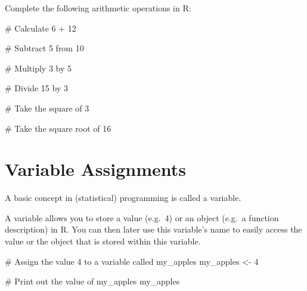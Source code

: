\documentclass[
  12pt,
  letterpaper,
]{scrbook}
\newenvironment{Shaded}{\begin{snugshade}}{\end{snugshade}}
\newcommand{\CommentTok}[1]{\textcolor[rgb]{0.37,0.37,0.37}{#1}}
\newcommand{\DecValTok}[1]{\textcolor[rgb]{0.68,0.00,0.00}{#1}}
\newcommand{\NormalTok}[1]{\textcolor[rgb]{0.00,0.23,0.31}{#1}}
\newcommand{\OtherTok}[1]{\textcolor[rgb]{0.00,0.23,0.31}{#1}}
\theoremstyle{plain}
\theoremstyle{definition}
\theoremstyle{remark}
\begin{document}
Complete the following arithmetic operations in R:

\begin{Shaded}
\begin{Highlighting}[]
\CommentTok{\# Calculate 6 + 12}
\end{Highlighting}
\end{Shaded}

\begin{Shaded}
\begin{Highlighting}[]
\CommentTok{\# Subtract 5 from 10}
\end{Highlighting}
\end{Shaded}

\begin{Shaded}
\begin{Highlighting}[]
\CommentTok{\# Multiply 3 by 5}
\end{Highlighting}
\end{Shaded}

\begin{Shaded}
\begin{Highlighting}[]
\CommentTok{\# Divide 15 by 3}
\end{Highlighting}
\end{Shaded}

\begin{Shaded}
\begin{Highlighting}[]
\CommentTok{\# Take the square of 3}
\end{Highlighting}
\end{Shaded}

\begin{Shaded}
\begin{Highlighting}[]
\CommentTok{\# Take the square root of 16}
\end{Highlighting}
\end{Shaded}

\section{Variable Assignments}\label{variable-assignments}

A basic concept in (statistical) programming is called a variable.

A variable allows you to store a value (e.g.~4) or an object (e.g.~a
function description) in R. You can then later use this variable's name
to easily access the value or the object that is stored within this
variable.

\begin{Shaded}
\begin{Highlighting}[]
\CommentTok{\# Assign the value 4 to a variable called my\_apples}
\NormalTok{my\_apples }\OtherTok{\textless{}{-}} \DecValTok{4}

\CommentTok{\# Print out the value of my\_apples}
\NormalTok{my\_apples}
\end{Highlighting}
\end{Shaded}
\end{document}

